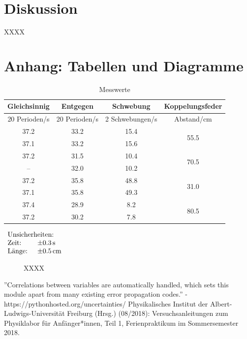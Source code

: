 \documentclass[11pt,a4paper]{article}
\begin{document}
\section{Diskussion}

XXXX

\pagebreak

\section{Anhang: Tabellen und Diagramme}

\begin{table}[h]
\centering
\caption{Messwerte} \vspace{11pt}

\begin{tabular}{cccc}
\textrm{Gleichsinnig} & \textrm{Entgegen} & \textrm{Schwebung} & \textrm{Koppelungsfeder}\\
\toprule
\textrm{20 Perioden}/\textrm{s} & \textrm{20 Perioden}/\textrm{s} & \textrm{2 Schwebungen}/\textrm{s} & \textrm{Abstand}/\textrm{cm}\\
\midrule 
37.2 & 33.2 & 15.4 & \multirow{2}{*}{55.5}\\
37.1 & 33.2 & 15.6 &\\
\hline 
37.2 & 31.5 & 10.4 & \multirow{2}{*}{70.5}\\
 --  & 32.0 & 10.2 &\\
\hline 
37.2 & 35.8 & 48.8 & \multirow{2}{*}{31.0}\\ 
37.1 & 35.8 & 49.3 &\\ 
\hline
37.4 & 28.9 & \phantom{0}8.2 & \multirow{2}{*}{80.5}\\
37.2 & 30.2 & \phantom{0}7.8 &\\ 
\bottomrule
\end{tabular}
$\begin{array}{ll}
\multicolumn{2}{l}{\textrm{Unsicherheiten:}}\\
\textrm{Zeit: } & \pm 0.3\, \textrm{s}\\
\textrm{Länge: } & \pm 0.5\, \textrm{cm}\\
\end{array}$
\label{Tab:1}
\end{table}

\begin{figure}[p]
\centering
\renewcommand\thefigure{BX}
\caption[XXXX]{XXXX}
\label{Abb:X}
\end{figure}

\begin{thebibliography}{9}
''Correlations between variables are automatically handled, which sets this module apart from many existing error propagation codes.'' - https://pythonhosted.org/uncertainties/
 Physikalisches Institut der Albert-Ludwigs-Universität Freiburg (Hrsg.) (08/2018): Versuchsanleitungen zum Physiklabor für Anfänger*innen, Teil 1, Ferienpraktikum im Sommersemester 2018.
\end{thebibliography}
\end{document}
